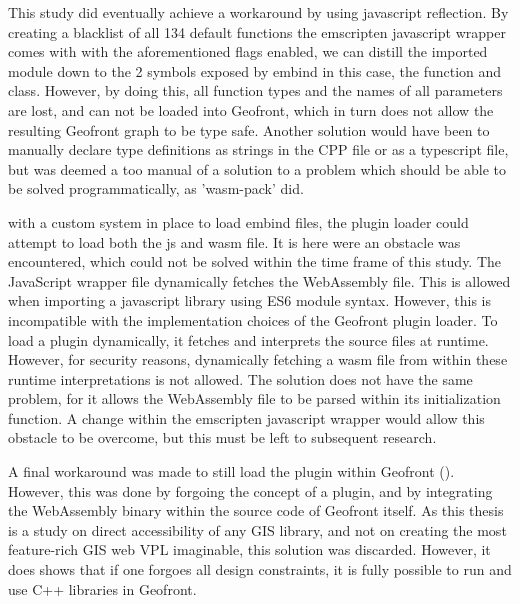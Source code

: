 This study did eventually achieve a workaround by using javascript reflection.
By creating a blacklist of all 134 default functions the emscripten javascript wrapper comes with with the aforementioned flags enabled, we can distill the imported module down to the 2 symbols exposed by embind in this case, the  function and  class.
However, by doing this, all function types and the names of all parameters are lost, and can not be loaded into Geofront, which in turn does not allow the resulting Geofront graph to be type safe. 
Another solution would have been to manually declare type definitions as strings in the CPP file or as a typescript file, but was deemed a too manual of a solution to a problem which should be able to be solved programmatically, as 'wasm-pack' did.

with a custom system in place to load embind files, the plugin loader could attempt to load both the js and wasm file. 
It is here were an obstacle was encountered, which could not be solved within the time frame of this study. 
The JavaScript wrapper file dynamically fetches the WebAssembly file. 
This is allowed when importing a javascript library using ES6 module syntax. 
However, this is incompatible with the implementation choices of the Geofront plugin loader. 
To load a plugin dynamically, it fetches and interprets the source files at runtime. 
However, for security reasons, dynamically fetching a wasm file from within these runtime interpretations is not allowed.
The  solution does not have the same problem, for it allows the WebAssembly file to be parsed within its initialization function.
A change within the emscripten javascript wrapper would allow this obstacle to be overcome, but this must be left to subsequent research. 

A final workaround was made to still load the plugin within Geofront (). 
However, this was done by forgoing the concept of a plugin, and by integrating the WebAssembly binary within the source code of Geofront itself.
As this thesis is a study on direct accessibility of any \ac{GIS} library, and not on creating the most feature-rich \ac{GIS} web \ac{VPL} imaginable, this solution was discarded.    
However, it does shows that if one forgoes all design constraints, it is fully possible to run and use C++ libraries in Geofront. 

